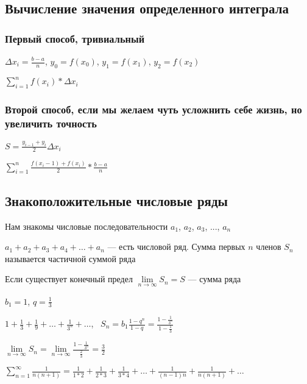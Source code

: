 \documentclass{article}
\begin{document}
\subsection{Вычисление значения определенного интеграла}

\subsubsection{Первый способ, тривиальный}

$\Delta x_i = \frac{b - a}{n}$, $y_0 = f(x_0)$, $y_1 = f(x_1)$, $y_2 = f(x_2)$

$\sum\limits_{i = 1}^{n} f(x_i) * \Delta x_i$

\subsubsection{Второй способ, если мы желаем чуть усложнить себе жизнь, но увеличить точность}

$S = \frac{y_{i - 1} + y_{i}}{2} \Delta x_i$

$\sum\limits_{i = 1}^{n} \frac{f(x_i - 1) + f(x_i)}{2} * \frac{b - a}{n}$

\subsection{Знакоположительные числовые ряды}

Нам знакомы числовые последовательности $a_1$, $a_2$, $a_3$, ..., $a_n$

$a_1 + a_2 + a_3 + a_4 + \dots + a_n$ — есть числовой ряд. Сумма первых $n$ членов $S_{n}$ называется частичной суммой ряда

Если существует конечный предел $\lim\limits_{n \to \infty} S_n = S$ — сумма ряда

\hfill

$b_1 = 1$, $q = \frac{1}{3}$

$1 + \frac{1}{3} + \frac{1}{9} + \dots + \frac{1}{3^{n}} + \dots$, \ $S_n = b_1 \frac{1 - q^{n}}{1 - q} = \frac{1 - \frac{1}{3^{n}}}{1 - \frac{1}{3}}$

$\lim\limits_{n \to \infty} S_{n} = \lim\limits_{n \to \infty} \frac{1 - \frac{1}{3^{n}}}{\frac{2}{3}} = \frac{3}{2}$

\hfill

\hfill

$\sum\limits_{n = 1}^{\infty} \frac{1}{n(n + 1)} = \frac{1}{1 * 2} + \frac{1}{2 * 3} + \frac{1}{3 * 4} + \dots + \frac{1}{(n - 1) n} + \frac{1}{n (n + 1)} + \dots$
\end{document}
